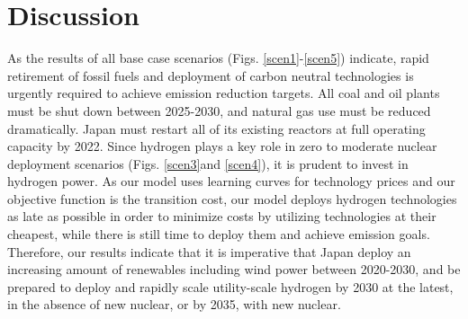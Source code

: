 \section{Discussion}


As the results of all base case scenarios (Figs. \ref{scen1}-\ref{scen5}) indicate, rapid retirement of fossil fuels and deployment of carbon neutral technologies is urgently required to achieve emission reduction targets. All coal and oil plants must be shut down between 2025-2030, and natural gas use must be reduced dramatically. Japan must restart all of its existing reactors at full operating capacity by 2022. Since hydrogen plays a key role in zero to moderate nuclear deployment scenarios (Figs. \ref{scen3}and \ref{scen4}), it is prudent to invest in hydrogen power. As our model uses learning curves for technology prices and our objective function is the transition cost, our model deploys hydrogen technologies as late as possible in order to minimize  costs by utilizing technologies at their cheapest, while there is still time to deploy them and achieve emission goals. Therefore, our results indicate that it is imperative that Japan deploy an increasing amount of renewables including wind power between 2020-2030, and be prepared to deploy and rapidly scale utility-scale hydrogen by 2030 at the latest, in the absence of new nuclear, or by 2035, with new nuclear.


